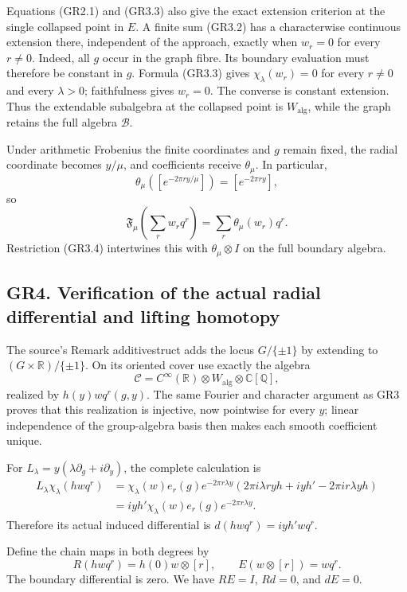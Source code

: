 Equations (GR2.1) and (GR3.3) also give the exact extension criterion at
the single collapsed point in \(E\). A finite sum (GR3.2) has a
characterwise continuous extension there, independent of the approach,
exactly when \(w_r=0\) for every \(r\ne0\). Indeed, all \(g\) occur in
the graph fibre. Its boundary evaluation must therefore be constant in
\(g\). Formula (GR3.3) gives \(\chi_\lambda(w_r)=0\) for every \(r\ne0\)
and every \(\lambda>0\); faithfulness gives \(w_r=0\). The converse is
constant extension. Thus the extendable subalgebra at the collapsed
point is \(W_{\mathrm{alg}}\), while the graph retains the full algebra
\(\mathcal B\).

Under arithmetic Frobenius the finite coordinates and \(g\) remain
fixed, the radial coordinate becomes \(y/\mu\), and coefficients receive
\(\theta_\mu\). In particular, \[
\theta_\mu([e^{-2\pi r y/\mu}])=[e^{-2\pi r y}],
\] so \[
\mathfrak F_\mu\!\left(\sum_r w_rq^r\right)
=\sum_r\theta_\mu(w_r)q^r.
\tag{GR3.5}
\] Restriction (GR3.4) intertwines this with \(\theta_\mu\otimes I\) on
the full boundary algebra.

\subsection{GR4. Verification of the actual radial differential and
lifting
homotopy}\label{gr4.-verification-of-the-actual-radial-differential-and-lifting-homotopy}

The source's Remark additivestruct adds the locus \(G/\{\pm1\}\) by
extending to \((G\times\mathbb R)/\{\pm1\}\). On its oriented cover use
exactly the algebra \[
\mathcal C=C^\infty(\mathbb R)\otimes W_{\mathrm{alg}}
 \otimes\mathbb C[\mathbb Q],
\] realized by \(h(y)wq^r(g,y)\). The same Fourier and character
argument as GR3 proves that this realization is injective, now pointwise
for every \(y\); linear independence of the group-algebra basis then
makes each smooth coefficient unique.

For \(L_\lambda=y(\lambda\partial_g+i\partial_y)\), the complete
calculation is \[
\begin{aligned}
L_\lambda\chi_\lambda(h wq^r)
&=\chi_\lambda(w)e_r(g)e^{-2\pi r\lambda y}
 \left(2\pi i\lambda r yh+iyh'-2\pi i r\lambda yh\right)\\
&=iyh'\chi_\lambda(w)e_r(g)e^{-2\pi r\lambda y}.
\end{aligned}
\tag{GR4.1}
\] Therefore its actual induced differential is \(d(h wq^r)=iyh'wq^r\).

Define the chain maps in both degrees by \[
R(h wq^r)=h(0)w\otimes[r],\qquad
E(w\otimes[r])=wq^r.
\] The boundary differential is zero. We have \(RE=I\), \(Rd=0\), and
\(dE=0\).

